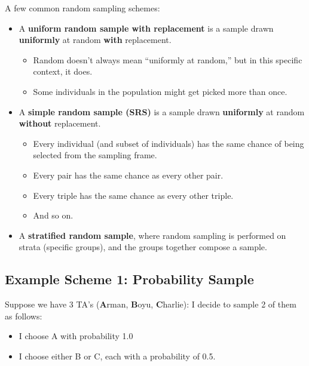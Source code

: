 \documentclass[
  letterpaper,
  DIV=11,
  numbers=noendperiod]{scrreprt}
\providecommand{\tightlist}{%
  \setlength{\itemsep}{0pt}\setlength{\parskip}{0pt}}\usepackage{longtable,booktabs,array}
\begin{document}
A few common random sampling schemes:

\begin{itemize}
\tightlist
\item
  A \textbf{uniform random sample with replacement} is a sample drawn
  \textbf{uniformly} at random \textbf{with} replacement.

  \begin{itemize}
  \tightlist
  \item
    Random doesn't always mean ``uniformly at random,'' but in this
    specific context, it does.
  \item
    Some individuals in the population might get picked more than once.
  \end{itemize}
\item
  A \textbf{simple random sample (SRS)} is a sample drawn
  \textbf{uniformly} at random \textbf{without} replacement.

  \begin{itemize}
  \tightlist
  \item
    Every individual (and subset of individuals) has the same chance of
    being selected from the sampling frame.
  \item
    Every pair has the same chance as every other pair.
  \item
    Every triple has the same chance as every other triple.
  \item
    And so on.
  \end{itemize}
\item
  A \textbf{stratified random sample}, where random sampling is
  performed on strata (specific groups), and the groups together compose
  a sample.
\end{itemize}

\subsection{Example Scheme 1: Probability
Sample}\label{example-scheme-1-probability-sample}

Suppose we have 3 TA's (\textbf{A}rman, \textbf{B}oyu,
\textbf{C}harlie): I decide to sample 2 of them as follows:

\begin{itemize}
\tightlist
\item
  I choose A with probability 1.0
\item
  I choose either B or C, each with a probability of 0.5.
\end{itemize}
\end{document}
